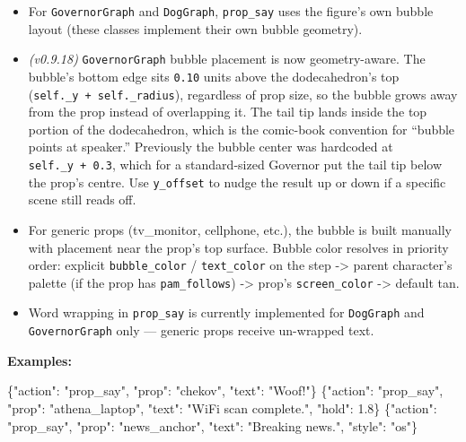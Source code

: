 \documentclass[
  11pt,
]{book}
\newenvironment{Shaded}{}{}
\newcommand{\DataTypeTok}[1]{\textcolor[rgb]{0.56,0.13,0.00}{#1}}
\newcommand{\FloatTok}[1]{\textcolor[rgb]{0.25,0.63,0.44}{#1}}
\newcommand{\FunctionTok}[1]{\textcolor[rgb]{0.02,0.16,0.49}{#1}}
\newcommand{\StringTok}[1]{\textcolor[rgb]{0.25,0.44,0.63}{#1}}
\providecommand{\tightlist}{%
  \setlength{\itemsep}{0pt}\setlength{\parskip}{0pt}}
\begin{document}
\begin{itemize}
\tightlist
\item
  For \texttt{GovernorGraph} and \texttt{DogGraph}, \texttt{prop\_say}
  uses the figure's own bubble layout (these classes implement their own
  bubble geometry).
\item
  \emph{(v0.9.18)} \texttt{GovernorGraph} bubble placement is now
  geometry-aware. The bubble's bottom edge sits \texttt{0.10} units
  above the dodecahedron's top
  (\texttt{self.\_y\ +\ self.\_radius}), regardless of prop size, so
  the bubble grows away from the prop instead of overlapping it. The
  tail tip lands inside the top portion of the dodecahedron, which
  is the comic-book convention for ``bubble points at speaker.''
  Previously the bubble center was hardcoded at \texttt{self.\_y\ +\ 0.3},
  which for a standard-sized Governor put the tail tip below the
  prop's centre. Use \texttt{y\_offset} to nudge the result up or
  down if a specific scene still reads off.
\item
  For generic props (tv\_monitor, cellphone, etc.), the bubble is built
  manually with placement near the prop's top surface. Bubble color
  resolves in priority order: explicit \texttt{bubble\_color} /
  \texttt{text\_color} on the step -\textgreater{} parent character's
  palette (if the prop has \texttt{pam\_follows}) -\textgreater{} prop's
  \texttt{screen\_color} -\textgreater{} default tan.
\item
  Word wrapping in \texttt{prop\_say} is currently implemented for
  \texttt{DogGraph} and \texttt{GovernorGraph} only --- generic props
  receive un-wrapped text.
\end{itemize}

\textbf{Examples:}

\begin{Shaded}
\begin{Highlighting}[]
\FunctionTok{\{}\DataTypeTok{"action"}\FunctionTok{:} \StringTok{"prop\_say"}\FunctionTok{,} \DataTypeTok{"prop"}\FunctionTok{:} \StringTok{"chekov"}\FunctionTok{,}  \DataTypeTok{"text"}\FunctionTok{:} \StringTok{"Woof!"}\FunctionTok{\}}
\FunctionTok{\{}\DataTypeTok{"action"}\FunctionTok{:} \StringTok{"prop\_say"}\FunctionTok{,} \DataTypeTok{"prop"}\FunctionTok{:} \StringTok{"athena\_laptop"}\FunctionTok{,}
 \DataTypeTok{"text"}\FunctionTok{:} \StringTok{"WiFi scan complete."}\FunctionTok{,} \DataTypeTok{"hold"}\FunctionTok{:} \FloatTok{1.8}\FunctionTok{\}}
\FunctionTok{\{}\DataTypeTok{"action"}\FunctionTok{:} \StringTok{"prop\_say"}\FunctionTok{,} \DataTypeTok{"prop"}\FunctionTok{:} \StringTok{"news\_anchor"}\FunctionTok{,} \DataTypeTok{"text"}\FunctionTok{:} \StringTok{"Breaking news."}\FunctionTok{,}
 \DataTypeTok{"style"}\FunctionTok{:} \StringTok{"os"}\FunctionTok{\}}
\end{Highlighting}
\end{Shaded}
\end{document}
